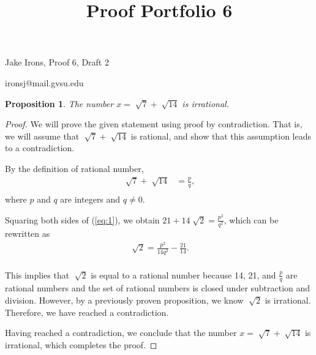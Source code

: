 \documentclass[11 pt]{article}
\title{Proof Portfolio 6}
\newtheorem{proposition}{Proposition}
\newcommand{\newpar}{\vspace{.15in}\noindent}
\begin{document}
\noindent Jake Irons, Proof 6, Draft 2

\noindent ironsj@mail.gvsu.edu

\newpar
\begin{proposition}
The number $x=\sqrt[]{7}+\sqrt[]{14}$ is irrational.
\end{proposition}
\begin{proof}
We will prove the given statement using proof by contradiction. That is, we will assume that $\sqrt[]{7}+\sqrt[]{14}$ is rational, and show that this assumption leads to a contradiction.

\newpar
By the definition of rational number,
\begin{align}
\sqrt[]{7}+\sqrt[]{14}&=\frac{p}{q}, \label{eq:1} \\
\nonumber \end{align} 
\noindent where $p$ and $q$ are integers and $q\neq0$.

\newpar Squaring both sides of (\ref{eq:1}), we obtain $21+14\sqrt[]{2}=\frac{p^2}{q^2}$, which can be rewritten as 
\begin{align*}
\sqrt[]{2}=\frac{p^2}{14q^2}-\frac{21}{14}. \\
\end{align*}

\newpar
This implies that $\sqrt[]{2}$ is equal to a rational number because 14, 21, and $\frac{p}{q}$ are rational numbers and the set of rational numbers is closed under subtraction and division.  However, by a previously proven proposition, we know $\sqrt[]{2}$ is irrational. Therefore, we have reached a contradiction.

\newpar Having reached a contradiction, we conclude that the number $x=\sqrt[]{7}+\sqrt[]{14}$ is irrational, which completes the proof.
\end{proof}
\end{document}
